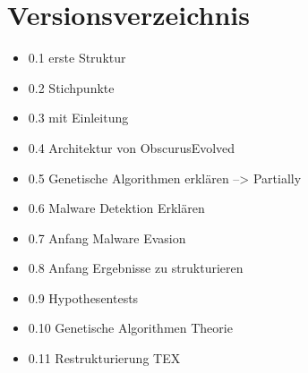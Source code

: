 \chapter{Versionsverzeichnis}

\begin{itemize}
    \item  0.1 erste Struktur
    \item 0.2 Stichpunkte
    \item 0.3 mit Einleitung
    \item 0.4 Architektur von ObscurusEvolved
    \item 0.5 Genetische Algorithmen erklären --> Partially
    \item 0.6 Malware Detektion Erklären
    \item 0.7 Anfang Malware Evasion
    \item 0.8 Anfang Ergebnisse zu strukturieren
    \item 0.9 Hypothesentests
    \item 0.10 Genetische Algorithmen Theorie
    \item 0.11 Restrukturierung TEX
    
\end{itemize}
